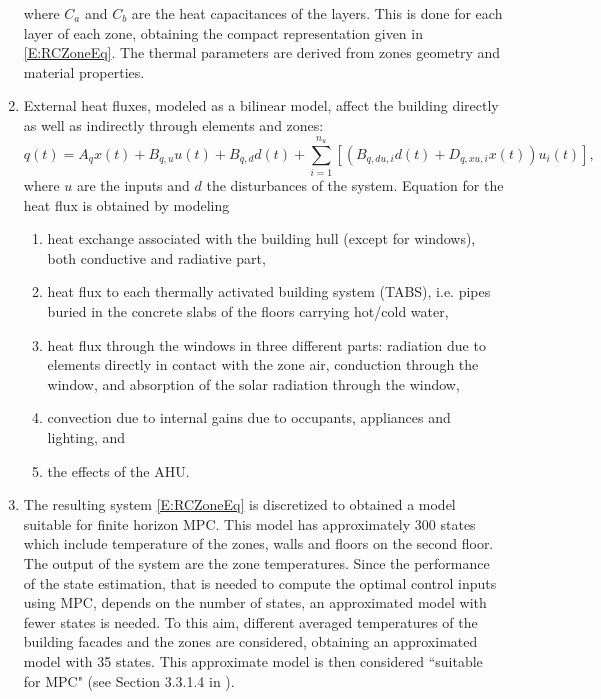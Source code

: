 \begin{enumerate}
		where $C_a$ and $C_b$ are the heat capacitances of the layers. This is done for each layer of each zone, obtaining the compact representation given in \eqref{E:RCZoneEq}. The thermal parameters are derived from zones geometry and material properties.
	\item External heat fluxes, modeled as a bilinear model, affect the building directly as well as indirectly through elements and zones:
		\begin{equation}\label{E:RCfluxes}
			q(t) = A_q x(t) + B_{q,u}u(t) + B_{q,d}d(t) + \sum_{i=1}^{n_u}{[\left(B_{q,du,i}d(t) + D_{q,xu,i}x(t)\right)u_i(t)]},
		\end{equation}
		where $u$ are the inputs and $d$ the disturbances of the system.
Equation \label{E:RCfluxes} for the heat flux is obtained by modeling
	\begin{enumerate}
		\item heat exchange associated with the building hull (except for windows), both conductive and radiative part,
		\item  heat flux to each thermally activated building system (TABS), i.e. pipes buried in the concrete slabs of the floors carrying hot/cold water,
		\item heat flux through the windows in three different parts: radiation due to elements directly in contact with the zone air, conduction through the window, and absorption of the solar radiation through the window,
		\item convection due to internal gains due to occupants, appliances and lighting, and
		\item the effects of the AHU.
	\end{enumerate}
	\item The resulting system \eqref{E:RCZoneEq} is discretized to obtained a model suitable for finite horizon MPC. This model has approximately 300 states which include temperature of the zones, walls and floors on the second floor. The output of the system are the zone temperatures.
	Since the performance of the state estimation, that is needed to compute the optimal control inputs using MPC, depends on the number of states, an approximated model with fewer states is needed.
	To this aim, different averaged temperatures of the building facades and the zones are considered, obtaining an approximated model with 35 states. This  approximate model is then considered ``suitable for MPC" (see Section 3.3.1.4 in \cite{SturzeneggerTR}). 
\end{enumerate}
	
